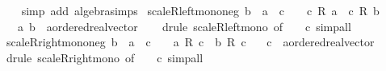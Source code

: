 \begin{isabellebody}
%
\isadelimproof
\ \ %
\endisadelimproof
%
\isatagproof
{}\isamarkupfalse%
\ {\isacharparenleft}{\kern0pt}simp\ add{\isacharcolon}{\kern0pt}\ algebra{\isacharunderscore}{\kern0pt}simps{\isacharparenright}{\kern0pt}%
\endisatagproof
{\isafoldproof}%
%
\isadelimproof
\isanewline
%
\endisadelimproof
\isanewline
{}\isamarkupfalse%
\ scaleR{\isacharunderscore}{\kern0pt}left{\isacharunderscore}{\kern0pt}mono{\isacharunderscore}{\kern0pt}neg{\isacharcolon}{\kern0pt}\ {\isachardoublequoteopen}b\ {\isasymle}\ a\ {\isasymLongrightarrow}\ c\ {\isasymle}\ {}\ {\isasymLongrightarrow}\ c\ {\isacharasterisk}{\kern0pt}\isactrlsub R\ a\ {\isasymle}\ c\ {\isacharasterisk}{\kern0pt}\isactrlsub R\ b{\isachardoublequoteclose}\isanewline
\ \ \ a\ b\ {\isacharcolon}{\kern0pt}{\isacharcolon}{\kern0pt}\ {\isachardoublequoteopen}{\isacharprime}{\kern0pt}a{\isacharcolon}{\kern0pt}{\isacharcolon}{\kern0pt}ordered{\isacharunderscore}{\kern0pt}real{\isacharunderscore}{\kern0pt}vector{\isachardoublequoteclose}\isanewline
%
\isadelimproof
\ \ %
\endisadelimproof
%
\isatagproof
{}\isamarkupfalse%
\ {\isacharparenleft}{\kern0pt}drule\ scaleR{\isacharunderscore}{\kern0pt}left{\isacharunderscore}{\kern0pt}mono\ {\isacharbrackleft}{\kern0pt}of\ {\isacharunderscore}{\kern0pt}\ {\isacharunderscore}{\kern0pt}\ {\isachardoublequoteopen}{\isacharminus}{\kern0pt}\ c{\isachardoublequoteclose}{\isacharbrackright}{\kern0pt}{\isacharcomma}{\kern0pt}\ simp{\isacharunderscore}{\kern0pt}all{\isacharparenright}{\kern0pt}%
\endisatagproof
{\isafoldproof}%
%
\isadelimproof
\isanewline
%
\endisadelimproof
\isanewline
{}\isamarkupfalse%
\ scaleR{\isacharunderscore}{\kern0pt}right{\isacharunderscore}{\kern0pt}mono{\isacharunderscore}{\kern0pt}neg{\isacharcolon}{\kern0pt}\ {\isachardoublequoteopen}b\ {\isasymle}\ a\ {\isasymLongrightarrow}\ c\ {\isasymle}\ {}\ {\isasymLongrightarrow}\ a\ {\isacharasterisk}{\kern0pt}\isactrlsub R\ c\ {\isasymle}\ b\ {\isacharasterisk}{\kern0pt}\isactrlsub R\ c{\isachardoublequoteclose}\isanewline
\ \ \ c\ {\isacharcolon}{\kern0pt}{\isacharcolon}{\kern0pt}\ {\isachardoublequoteopen}{\isacharprime}{\kern0pt}a{\isacharcolon}{\kern0pt}{\isacharcolon}{\kern0pt}ordered{\isacharunderscore}{\kern0pt}real{\isacharunderscore}{\kern0pt}vector{\isachardoublequoteclose}\isanewline
%
\isadelimproof
\ \ %
\endisadelimproof
%
\isatagproof
{}\isamarkupfalse%
\ {\isacharparenleft}{\kern0pt}drule\ scaleR{\isacharunderscore}{\kern0pt}right{\isacharunderscore}{\kern0pt}mono\ {\isacharbrackleft}{\kern0pt}of\ {\isacharunderscore}{\kern0pt}\ {\isacharunderscore}{\kern0pt}\ {\isachardoublequoteopen}{\isacharminus}{\kern0pt}\ c{\isachardoublequoteclose}{\isacharbrackright}{\kern0pt}{\isacharcomma}{\kern0pt}\ simp{\isacharunderscore}{\kern0pt}all{\isacharparenright}{\kern0pt}%

\end{isabellebody}
